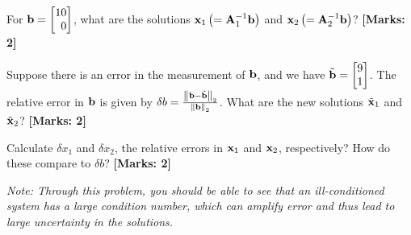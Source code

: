 \documentclass[12pt]{article}
\def\mf{\ensuremath\mathbf}
\def\lp{\ensuremath\left(}
\def\rp{\ensuremath\right)}
\def\lV{\ensuremath\left\lVert}
\def\rV{\ensuremath\right\rVert}
\def\ls{\ensuremath\left[}
\def\rs{\ensuremath\right]}
\def\bmx{\ensuremath\begin{bmatrix*}[r]}
\def\emx{\ensuremath\end{bmatrix*}}
\begin{document}
\begin{enumerate}
\begin{enumerate}
        For $\mf{b} = \bmx 10 \\ 0\emx$, what are the solutions $\mf{x}_1\lp=\mf{A}_1^{-1}\mf{b}\rp$ and $\mf{x}_2\lp=\mf{A}_2^{-1}\mf{b}\rp$?  \textbf{[Marks: 2]}

        Suppose there is an error in the measurement of $\mf{b}$, and we have $\tilde{\mf{b}} = \bmx 9 \\ 1\emx$. The relative error in $\mf{b}$ is given by $\delta b = \frac{\lV \mf{b} - \tilde{\mf{b}}\rV_2}{\lV\mf{b}\rV_2}$. What are the new solutions $\tilde{\mf{x}}_1$ and $\tilde{\mf{x}}_2$? \textbf{[Marks: 2]}

        Calculate $\delta x_1$ and $\delta x_2$, the relative errors in $\mf{x}_1$ and $\mf{x}_2$, respectively? How do these compare to $\delta b$? \textbf{[Marks: 2]}

        \textit{Note: Through this problem, you should be able to see that an ill-conditioned system has a large condition number, which can amplify error and thus lead to large uncertainty in the solutions.}
    \end{enumerate}



\end{enumerate}
\end{document}
